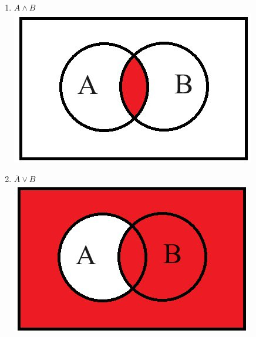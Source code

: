     \begin{minipage}[t]{0.4\textwidth}
        \centering
        \begin{enumerate}
            \item $A \wedge B$\\
            \includegraphics[width=1\linewidth]{images/im1}

            \item $\overline A \vee B$\\
            \includegraphics[width=1\linewidth]{images/im2}
        \end{enumerate}
    \end{minipage}
